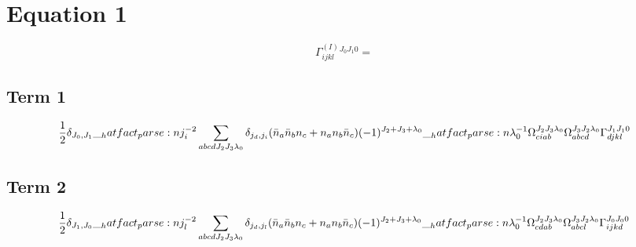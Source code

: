\documentclass{scrartcl}
\begin{document}
\section{Equation 1}
\begin{dmath*}
\Gamma^{(I)}_{i j k l}^{{J}_{0} {J}_{1} 0} = 
\end{dmath*}
\subsection{Term 1}
\begin{dmath*}
\frac{1}{2} \* \delta_{{J}_{0},{J}_{1}} \* \hatfact{{j}_{i}^{-2}} \* \sum_{a b c d {J}_{2} {J}_{3} {{\lambda}}_{0}} \* \delta_{{j}_{d},{j}_{i}} \* (\bar{n}_{a} \* \bar{n}_{b} \* n_{c} + n_{a} \* n_{b} \* \bar{n}_{c}) \* (-1)^{{J}_{2}+{J}_{3}+{{\lambda}}_{0}} \* \hatfact{{{\lambda}}_{0}^{-1}} \* \Omega_{c i a b}^{{J}_{2} {J}_{3} {{\lambda}}_{0}} \* \Omega_{a b c d}^{{J}_{3} {J}_{2} {{\lambda}}_{0}} \* \Gamma_{d j k l}^{{J}_{1} {J}_{1} 0}
\end{dmath*}
\subsection{Term 2}
\begin{dmath*}
\frac{1}{2} \* \delta_{{J}_{1},{J}_{0}} \* \hatfact{{j}_{l}^{-2}} \* \sum_{a b c d {J}_{2} {J}_{3} {{\lambda}}_{0}} \* \delta_{{j}_{d},{j}_{l}} \* (\bar{n}_{a} \* \bar{n}_{b} \* n_{c} + n_{a} \* n_{b} \* \bar{n}_{c}) \* (-1)^{{J}_{2}+{J}_{3}+{{\lambda}}_{0}} \* \hatfact{{{\lambda}}_{0}^{-1}} \* \Omega_{c d a b}^{{J}_{2} {J}_{3} {{\lambda}}_{0}} \* \Omega_{a b c l}^{{J}_{3} {J}_{2} {{\lambda}}_{0}} \* \Gamma_{i j k d}^{{J}_{0} {J}_{0} 0}
\end{dmath*}
\end{document}
